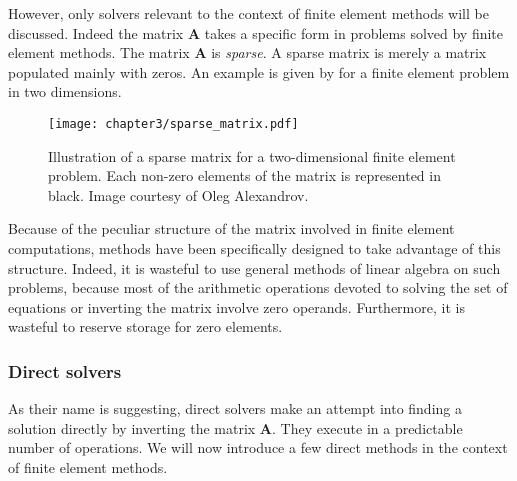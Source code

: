 However, only solvers relevant to the context of finite element methods will be discussed. Indeed the matrix $ \mathbf{A} $ takes a specific form in problems solved by finite element methods. The matrix $ \mathbf{A} $ is \emph{sparse}. A sparse matrix is merely a matrix populated mainly with zeros. An example is given by  for a finite element problem in two dimensions.
\begin{figure}[ht]
\begin{center}
\texttt{[image: chapter3/sparse\_matrix.pdf]}
\end{center}
\caption[Illustration of a sparse matrix for a 2D finite element problem]{Illustration of a sparse matrix for a two-dimensional finite element problem. Each non-zero elements of the matrix is represented in black. Image courtesy of Oleg Alexandrov.}
\label{chap3:fig-sparse}
\end{figure}
Because of the peculiar structure of the matrix involved in finite element computations, methods have been specifically designed to take advantage of this structure. Indeed, it is wasteful to use general methods of linear algebra on such problems, because most of the arithmetic operations devoted to solving the set of equations or inverting the matrix involve zero operands. Furthermore, it is wasteful to reserve storage for zero elements. 

		\subsubsection*{Direct solvers}
As their name is suggesting, direct solvers make an attempt into finding a solution directly by inverting the matrix $ \mathbf{A} $. They execute in a predictable number of operations. We will now introduce a few direct methods in the context of finite element methods. 


